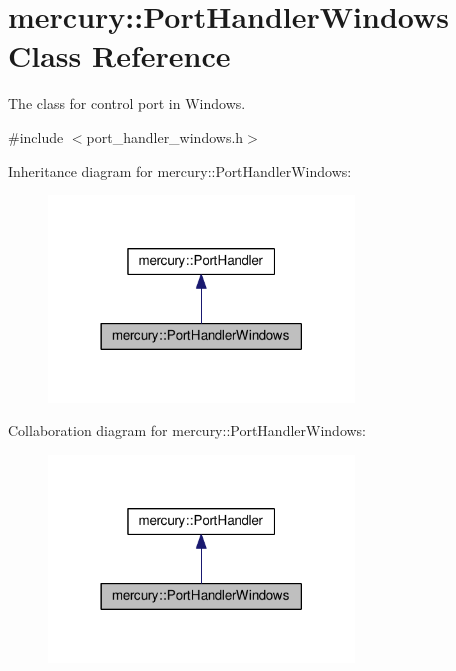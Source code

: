 \hypertarget{classmercury_1_1_port_handler_windows}{}\section{mercury\+:\+:Port\+Handler\+Windows Class Reference}
\label{classmercury_1_1_port_handler_windows}


The class for control port in Windows.  




{\ttfamily \#include $<$port\+\_\+handler\+\_\+windows.\+h$>$}



Inheritance diagram for mercury\+:\+:Port\+Handler\+Windows\+:\nopagebreak
\begin{figure}[H]
\begin{center}
\leavevmode
\includegraphics[width=230pt]{classmercury_1_1_port_handler_windows__inherit__graph}
\end{center}
\end{figure}


Collaboration diagram for mercury\+:\+:Port\+Handler\+Windows\+:\nopagebreak
\begin{figure}[H]
\begin{center}
\leavevmode
\includegraphics[width=230pt]{classmercury_1_1_port_handler_windows__coll__graph}
\end{center}
\end{figure}
